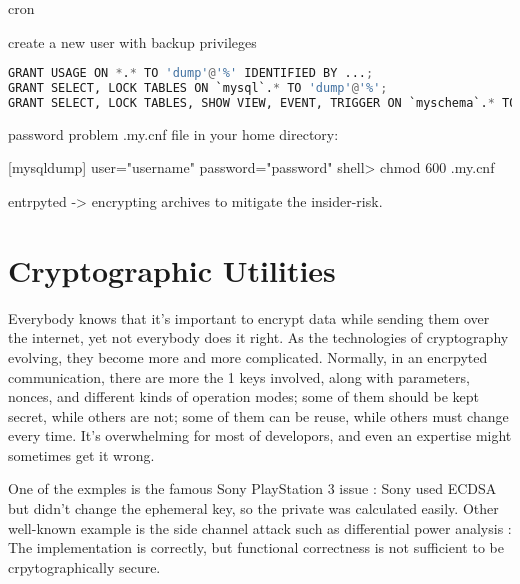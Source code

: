 \documentclass[conference]{IEEEtran}
\begin{document}
cron %

create a new user with backup privileges
\begin{lstlisting}[language=python]
GRANT USAGE ON *.* TO 'dump'@'%' IDENTIFIED BY ...;
GRANT SELECT, LOCK TABLES ON `mysql`.* TO 'dump'@'%';
GRANT SELECT, LOCK TABLES, SHOW VIEW, EVENT, TRIGGER ON `myschema`.* TO 'dump'@'\%';
\end{lstlisting}

password problem
.my.cnf file in your home directory:

[mysqldump]
user="username"
password="password"
shell> chmod 600 .my.cnf

entrpyted
-> encrypting archives to mitigate the insider-risk.



\section{Cryptographic Utilities}
Everybody knows that it's important to encrypt data while sending them over the internet,
yet not everybody does it right.
As the technologies of cryptography evolving,
they become more and more complicated.
Normally, in an encrpyted communication, there are more the 1 keys involved,
along with parameters, nonces, and different kinds of operation modes;
some of them should be kept secret, while others are not;
some of them can be reuse, while others must change every time.
It's overwhelming for most of developors, and even an expertise might sometimes get it wrong.

One of the exmples is the famous Sony PlayStation 3 issue \cite{PS3_Jailbreak}:
Sony used ECDSA \cite{ECDSA} but didn't change the ephemeral key, so the
private was calculated easily.
Other well-known example is the
side channel attack such as differential power analysis \cite{differential}:
The implementation is correctly, but functional correctness is not sufficient to
be crpytographically secure.
\end{document}
